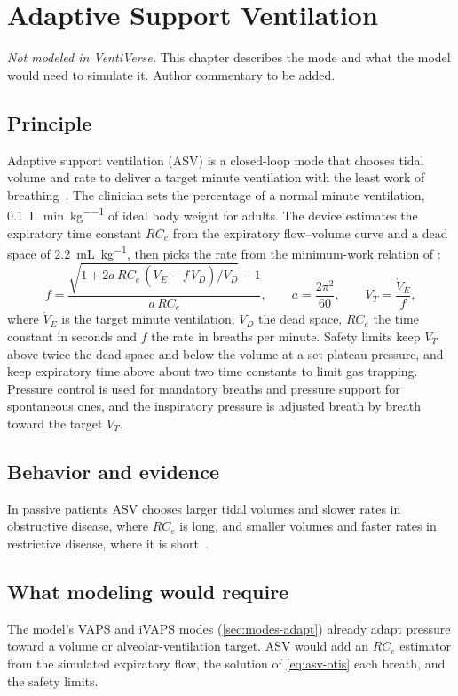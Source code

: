 \chapter{Adaptive Support Ventilation}
\label{ch:asv}

\begin{authornote}
\emph{Not modeled in VentiVerse.} This chapter describes the mode and what the model would need to simulate it. Author commentary to be added.
\end{authornote}

\section{Principle}
Adaptive support ventilation (ASV) is a closed-loop mode that chooses tidal volume and rate to deliver a target minute ventilation with the least work of breathing~\citep{laubscher1994}. The clinician sets the percentage of a normal minute ventilation, \SI{0.1}{\liter\per\minute\per\kilo\gram} of ideal body weight for adults. The device estimates the expiratory time constant $RC_e$ from the expiratory flow--volume curve and a dead space of \SI{2.2}{\milli\liter\per\kilo\gram}, then picks the rate from the minimum-work relation of \citet{otis1950}:
\begin{equation}
f=\frac{\sqrt{1+2a\,RC_e\,(\dot V_E-f\,V_D)/V_D}-1}{a\,RC_e},\qquad a=\frac{2\pi^2}{60},\qquad V_T=\frac{\dot V_E}{f},
\label{eq:asv-otis}
\end{equation}
where $\dot V_E$ is the target minute ventilation, $V_D$ the dead space, $RC_e$ the time constant in seconds and $f$ the rate in breaths per minute. Safety limits keep $V_T$ above twice the dead space and below the volume at a set plateau pressure, and keep expiratory time above about two time constants to limit gas trapping. Pressure control is used for mandatory breaths and pressure support for spontaneous ones, and the inspiratory pressure is adjusted breath by breath toward the target $V_T$.

\section{Behavior and evidence}
In passive patients ASV chooses larger tidal volumes and slower rates in obstructive disease, where $RC_e$ is long, and smaller volumes and faster rates in restrictive disease, where it is short~\citep{arnal2008}.

\section{What modeling would require}
The model's VAPS and iVAPS modes (\cref{sec:modes-adapt}) already adapt pressure toward a volume or alveolar-ventilation target. ASV would add an $RC_e$ estimator from the simulated expiratory flow, the solution of \cref{eq:asv-otis} each breath, and the safety limits.
